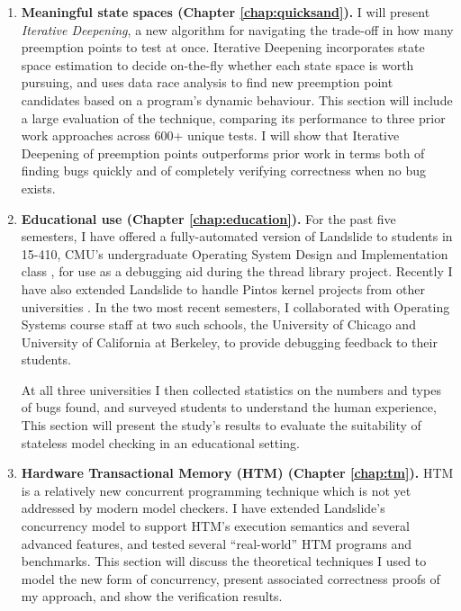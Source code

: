 \begin{enumerate}
	\item {\bf Meaningful state spaces (Chapter \ref{chap:quicksand}).}
		I will present {\em Iterative Deepening}, a new algorithm for navigating the trade-off in how many preemption points to test at once.
		Iterative Deepening incorporates state space estimation \cite{estimation} to decide on-the-fly whether each state space is worth pursuing, and uses data race analysis \cite{tsan} to find new preemption point candidates based on a program's dynamic behaviour.
		This section will include a large evaluation of the technique, comparing its performance to three prior work approaches across 600+ unique tests.
		I will show that Iterative Deepening of preemption points outperforms prior work in terms both of finding bugs quickly and of completely verifying correctness when no bug exists.
	\item {\bf Educational use (Chapter \ref{chap:education}).}
		For the past five semesters, I have offered a fully-automated version of Landslide to students in 15-410, CMU's undergraduate Operating System Design and Implementation class \cite{kspec,thrlib}, for use as a debugging aid during the thread library project.
		Recently I have also extended Landslide to handle Pintos kernel projects from other universities \cite{pintos}.
		In the two most recent semesters, I collaborated with Operating Systems course staff at two such schools, the University of Chicago and University of California at Berkeley,
		to provide debugging feedback to their students.

		At all three universities I then collected statistics on the numbers and types of bugs found,
		and surveyed students to understand the human experience,
		This section will present the study's results
		to evaluate the suitability of stateless model checking in an educational setting.
	\item {\bf Hardware Transactional Memory (HTM) (Chapter \ref{chap:tm}).}
		HTM is a relatively new concurrent programming technique \cite{htm-haswell,htm-experience}
		which is not yet addressed by modern model checkers.
		I have extended Landslide's concurrency model to support
		HTM's execution semantics and several advanced features, %
		and tested several ``real-world'' HTM programs and benchmarks.
		This section will discuss the theoretical techniques I used to model the new form of concurrency,
		present associated correctness proofs of my approach,
		and show the verification results.
\end{enumerate}

